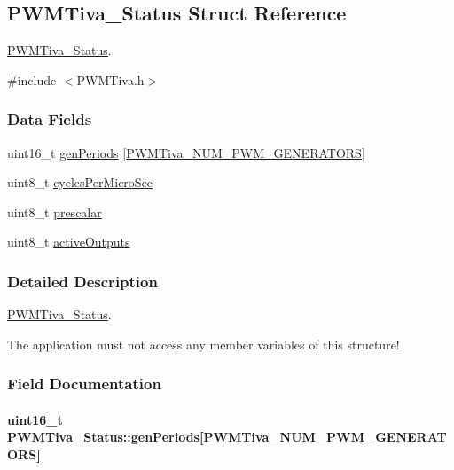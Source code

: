 \subsection{P\+W\+M\+Tiva\+\_\+\+Status Struct Reference}
\label{struct_p_w_m_tiva___status}


\hyperlink{struct_p_w_m_tiva___status}{P\+W\+M\+Tiva\+\_\+\+Status}.  




{\ttfamily \#include $<$P\+W\+M\+Tiva.\+h$>$}

\subsubsection*{Data Fields}
\begin{DoxyCompactItemize}
\item 
uint16\+\_\+t \hyperlink{struct_p_w_m_tiva___status_afe579c2bce8bcd75ca11ab5e2689ba33}{gen\+Periods} \mbox{[}\hyperlink{_p_w_m_tiva_8h_a3b71203004a2bad6632936ac4d7274de}{P\+W\+M\+Tiva\+\_\+\+N\+U\+M\+\_\+\+P\+W\+M\+\_\+\+G\+E\+N\+E\+R\+A\+T\+O\+R\+S}\mbox{]}
\item 
uint8\+\_\+t \hyperlink{struct_p_w_m_tiva___status_ab45856183a3fe6f2f350d49b9d60330e}{cycles\+Per\+Micro\+Sec}
\item 
uint8\+\_\+t \hyperlink{struct_p_w_m_tiva___status_a92fbd5e7351f2114f0403ca363eb51fb}{prescalar}
\item 
uint8\+\_\+t \hyperlink{struct_p_w_m_tiva___status_a7f5f9f86d8c0ddc3d90296fadf6e1133}{active\+Outputs}
\end{DoxyCompactItemize}


\subsubsection{Detailed Description}
\hyperlink{struct_p_w_m_tiva___status}{P\+W\+M\+Tiva\+\_\+\+Status}. 

The application must not access any member variables of this structure! 

\subsubsection{Field Documentation}
\paragraph[{gen\+Periods}]{\setlength{\rightskip}{0pt plus 5cm}uint16\+\_\+t P\+W\+M\+Tiva\+\_\+\+Status\+::gen\+Periods\mbox{[}{\bf P\+W\+M\+Tiva\+\_\+\+N\+U\+M\+\_\+\+P\+W\+M\+\_\+\+G\+E\+N\+E\+R\+A\+T\+O\+R\+S}\mbox{]}}\label{struct_p_w_m_tiva___status_afe579c2bce8bcd75ca11ab5e2689ba33}
